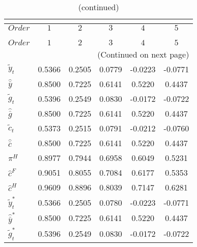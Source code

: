  
\begin{center}
\begin{longtable}{lccccc} 
\caption{COEFFICIENTS OF AUTOCORRELATION}\\
 \label{Table:th_autocorr_matrix}\\
\toprule 
$Order              $	 & 	 $         1$	 & 	 $         2$	 & 	 $         3$	 & 	 $         4$	 & 	 $         5$\\
\midrule \endfirsthead 
\caption{(continued)}\\
 \toprule \\ 
$Order              $	 & 	 $         1$	 & 	 $         2$	 & 	 $         3$	 & 	 $         4$	 & 	 $         5$\\
\midrule \endhead 
\midrule \multicolumn{6}{r}{(Continued on next page)} \\ \bottomrule \endfoot 
\bottomrule \endlastfoot 
${\tilde y_t}       $	 & 	    0.5366	 & 	    0.2505	 & 	    0.0779	 & 	   -0.0223	 & 	   -0.0771 \\ 
${\hat {\bar y}}    $	 & 	    0.8500	 & 	    0.7225	 & 	    0.6141	 & 	    0.5220	 & 	    0.4437 \\ 
${\tilde g_t}       $	 & 	    0.5396	 & 	    0.2549	 & 	    0.0830	 & 	   -0.0172	 & 	   -0.0722 \\ 
${\hat {\bar g}}    $	 & 	    0.8500	 & 	    0.7225	 & 	    0.6141	 & 	    0.5220	 & 	    0.4437 \\ 
${\tilde c_t}       $	 & 	    0.5373	 & 	    0.2515	 & 	    0.0791	 & 	   -0.0212	 & 	   -0.0760 \\ 
${\hat {\bar c}}    $	 & 	    0.8500	 & 	    0.7225	 & 	    0.6141	 & 	    0.5220	 & 	    0.4437 \\ 
${\pi^H}            $	 & 	    0.8977	 & 	    0.7944	 & 	    0.6958	 & 	    0.6049	 & 	    0.5231 \\ 
${\hat c^F}         $	 & 	    0.9051	 & 	    0.8055	 & 	    0.7084	 & 	    0.6177	 & 	    0.5353 \\ 
${\hat c^H}         $	 & 	    0.9609	 & 	    0.8896	 & 	    0.8039	 & 	    0.7147	 & 	    0.6281 \\ 
${\tilde y_t^*}     $	 & 	    0.5366	 & 	    0.2505	 & 	    0.0780	 & 	   -0.0223	 & 	   -0.0771 \\ 
${\hat {\bar y}^*}  $	 & 	    0.8500	 & 	    0.7225	 & 	    0.6141	 & 	    0.5220	 & 	    0.4437 \\ 
${\tilde g_t^*}     $	 & 	    0.5396	 & 	    0.2549	 & 	    0.0830	 & 	   -0.0172	 & 	   -0.0722 \\ 

\end{longtable}
\end{center}
